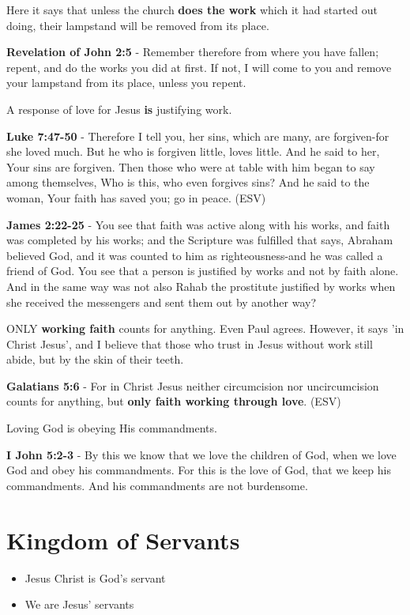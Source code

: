 \documentclass[11pt]{article}
\begin{document}
Here it says that unless the church \textbf{does the work} which it had started out doing, their lampstand will be removed from its place.

\textbf{Revelation of John 2:5} - Remember therefore from where you have fallen; repent, and do the works you did at first. If not, I will come to you and remove your lampstand from its place, unless you repent.

A response of love for Jesus \textbf{is} justifying work.

\textbf{Luke 7:47-50} - Therefore I tell you, her sins, which are many, are forgiven-for she loved much. But he who is forgiven little, loves little. And he said to her, Your sins are forgiven. Then those who were at table with him began to say among themselves, Who is this, who even forgives sins? And he said to the woman, Your faith has saved you; go in peace. (ESV)

\textbf{James 2:22-25} - You see that faith was active along with his works, and faith was completed by his works; and the Scripture was fulfilled that says, Abraham believed God, and it was counted to him as righteousness-and he was called a friend of God. You see that a person is justified by works and not by faith alone. And in the same way was not also Rahab the prostitute justified by works when she received the messengers and sent them out by another way?

ONLY \textbf{working faith} counts for anything. Even Paul agrees. However, it says 'in Christ Jesus', and I believe that those who trust in Jesus without work still abide, but by the skin of their teeth.

\textbf{Galatians 5:6} - For in Christ Jesus neither circumcision nor uncircumcision counts for anything, but \textbf{only faith working through love}. (ESV)

Loving God is obeying His commandments.

\textbf{I John 5:2-3} - By this we know that we love the children of God, when we love God and obey his commandments. For this is the love of God, that we keep his commandments. And his commandments are not burdensome.

\section{Kingdom of Servants}
\label{sec:orgb566027}
\begin{itemize}
\item Jesus Christ is God's servant
\item We are Jesus' servants
\end{itemize}
\end{document}
